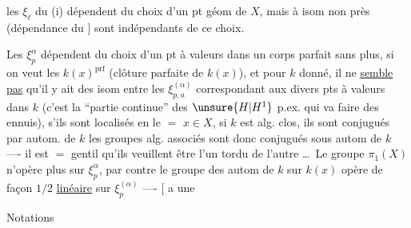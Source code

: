 les $\xi_{\ell}$ du (i) dépendent du choix d'un pt géom de $X$, mais à isom non  près (dépendance du ]  sont indépendants de ce choix.

Les $\xi_p^\alpha$ dépendent du choix d'un  pt  à valeurs dans un corps parfait sans plus, si on veut les $k(x)^{\mathrm{prf}}$\deleted{\unsure{,}} (clôture parfaite de $k(x)$), et pour $k$ donné, il ne \uline{semble pas} qu'il y ait  des isom entre les $\xi_{p,a}^{(\alpha)}$ correspondant aux divers pts à valeurs dans $k$ (c'est la ``partie continue'' des $\unsure{H|H^1}$ p.ex. qui va faire des ennuis), s'ils sont localisés en le $=$ $x\in X$,   si $k$ est alg. clos, ils sont conjugués par autom. de $k$  les groupes alg. associés sont donc conjugués sous autom de $k$ ---- il est $=$ gentil qu'ils veuillent être l'un tordu de l'autre \ldots\ Le groupe $\pi_1(X)$ n'opère plus sur $\xi_p^\alpha$,
par contre le groupe des autom de $k$ sur $k(x)$ \deleted{\unsure{[ou = de $k$|[ou = de $k$,}}
\deleted{\unsure{il existe]}} opère de façon $1/2$ \uline{linéaire} sur $\xi_p^{(\alpha)}$ ---- [ a une 

Notations
